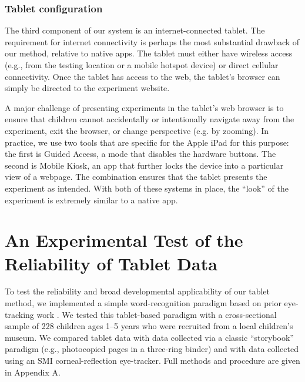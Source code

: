 \documentclass[man,noapacite]{apa2}
\begin{document}
\subsubsection{Tablet configuration}

The third component of our system is an internet-connected tablet. The requirement for internet connectivity is perhaps the most substantial drawback of our method, relative to native apps. The tablet must either have wireless access (e.g., from the testing location or a mobile hotspot device) or direct cellular connectivity. Once the tablet has access to the web, the tablet's browser can simply be directed to the experiment website. 

A major challenge of presenting experiments in the tablet's web browser is to ensure that children cannot accidentally or intentionally navigate away from the experiment, exit the browser, or change perspective (e.g. by zooming). In practice, we use two tools that are specific for the Apple iPad for this purpose: the first is Guided Access, a mode that disables the hardware buttons. The second is Mobile Kiosk, an app that further locks the device into a particular view of a webpage. The combination ensures that the tablet presents the experiment as intended. With both of these systems in place, the ``look'' of the experiment is extremely similar to a native app. 

\section{An Experimental Test of the Reliability of Tablet Data}
 
To test the reliability and broad developmental applicability of our tablet method, we implemented a simple word-recognition paradigm based on prior eye-tracking work \cite{fernald1998,fernald2006,bion2013}. We tested this tablet-based paradigm with a cross-sectional sample of 228 children ages 1--5 years who were recruited from a local children's museum. We compared tablet data with data collected via a classic ``storybook'' paradigm (e.g., photocopied pages in a three-ring binder) and with data collected using an SMI corneal-reflection eye-tracker. Full methods and procedure are given in Appendix A. 
\end{document}

